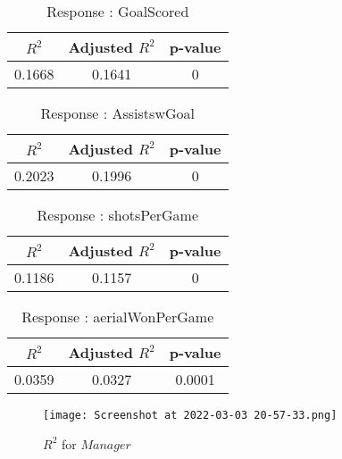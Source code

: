 \documentclass[12pt]{article}
\begin{document}
	
\begin{minipage}{0.5\textwidth}
	\begin{table}[H]
	\centering
	\caption{Response : GoalScored}\label{table:1a}
	{\begin{tabular}{|c|c|c|}
			\hline
			$ R^2 $ & Adjusted $ R^2 $ & p-value \\
			\hline
			0.1668 & 0.1641 & 0 \\
			\hline
		\end{tabular}
	}
\end{table}
\begin{table}[H]
	\centering
	\caption{Response : AssistswGoal}\label{table:1a}
	{\begin{tabular}{|c|c|c|}
			\hline
			$ R^2 $ & Adjusted $ R^2 $ & p-value \\
			\hline
			0.2023 & 0.1996 & 0 \\
			\hline
		\end{tabular}
	}
\end{table}
\end{minipage}
\hfill
\begin{minipage}{0.5\textwidth}
	\begin{table}[H]
	\centering
	\caption{Response : shotsPerGame }\label{table:1a}
	{\begin{tabular}{|c|c|c|}
			\hline
			$ R^2 $ & Adjusted $ R^2 $ & p-value \\
			\hline
			0.1186 & 0.1157 & 0 \\
			\hline
		\end{tabular}
	}
\end{table}
\begin{table}[H]
	\centering
	\caption{Response : aerialWonPerGame}\label{table:1a}
	{\begin{tabular}{|c|c|c|}
			\hline
			$ R^2 $ & Adjusted $ R^2 $ & p-value \\
			\hline
			0.0359 & 0.0327 & 0.0001 \\
			\hline
		\end{tabular}
	}
\end{table}
\end{minipage}


\begin{figure}[H]
	\centering
	\texttt{[image: Screenshot at 2022-03-03 20-57-33.png]}
	\caption{$ R^2 $ for $ Manager $}
	\label{fig:1}
\end{figure}
\end{document}
